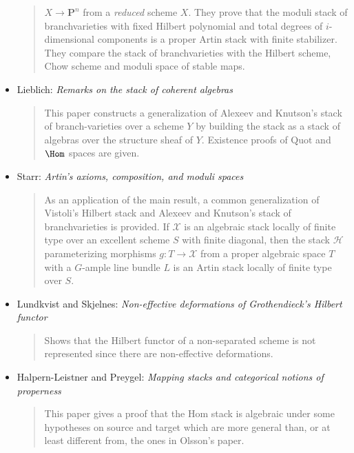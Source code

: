 \begin{itemize}
\begin{quote}
$X \rightarrow \mathbf{P}^n$ from a \emph{reduced} scheme $X$. They prove
that the moduli stack of branchvarieties with fixed Hilbert polynomial and
total degrees of $i$-dimensional components is a proper Artin stack with
finite stabilizer. They compare the stack of branchvarieties with the
Hilbert scheme, Chow scheme and moduli space of stable maps.
\end{quote}
\item Lieblich: \emph{Remarks on the stack of coherent algebras}
\cite{lieblich_remarks}
\begin{quote}
This paper constructs a generalization of Alexeev and Knutson's stack of
branch-varieties over a scheme $Y$ by building the stack as a stack of
algebras over the structure sheaf of $Y$. Existence proofs of $\text{Quot}$
and $\Hom$ spaces are given.
\end{quote}
\item Starr: \emph{Artin's axioms, composition, and moduli spaces}
\cite{starr_artin}
\begin{quote}
As an application of the main result, a common generalization of Vistoli's
Hilbert stack \cite{vistoli_hilbert} and Alexeev and Knutson's stack of
branchvarieties \cite{alexeev-knutson} is provided. If $\mathcal{X}$ is
an algebraic stack locally of finite type over an excellent scheme $S$
with finite diagonal, then the stack $\mathcal{H}$ parameterizing morphisms
$g: T \rightarrow \mathcal{X}$ from a proper algebraic space $T$ with a
$G$-ample line bundle $L$ is an Artin stack locally of finite type over $S$.
\end{quote}
\item Lundkvist and Skjelnes:
\emph{Non-effective deformations of Grothendieck's Hilbert functor}
\cite{lundkvist-skjelnes}
\begin{quote}
Shows that the Hilbert functor of a non-separated scheme is not represented
since there are non-effective deformations.
\end{quote}
\item Halpern-Leistner and Preygel:
\emph{Mapping stacks and categorical notions of properness}
\cite{HL-P}
\begin{quote}
This paper gives a proof that the Hom stack is algebraic under some
hypotheses on source and target which are more general than, or at
least different from, the ones in Olsson's paper.
\end{quote}
\end{itemize}



